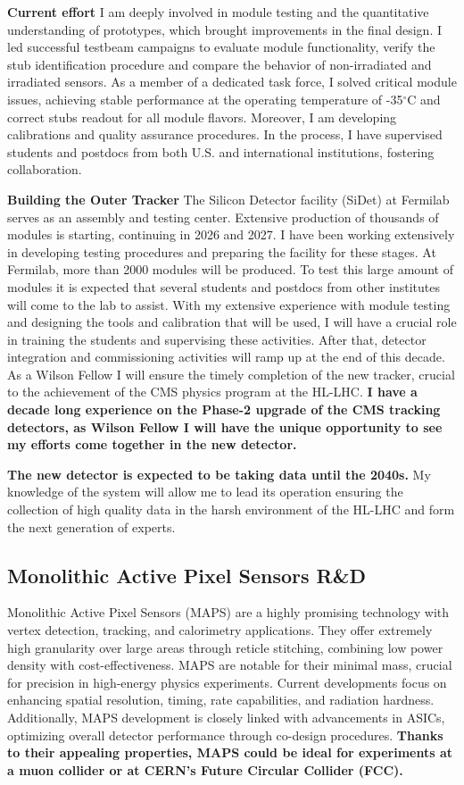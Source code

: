 {\begin{flushleft}
\textbf{Current effort}
I am deeply involved in module testing and the quantitative understanding of prototypes, which brought improvements in the final design. I led successful testbeam campaigns to evaluate module functionality, verify the stub identification procedure and compare the behavior of non-irradiated and irradiated sensors. As a member of a dedicated task force, I solved critical module issues, achieving stable performance at the operating temperature of -35$^{\circ}$C and correct stubs readout for all module flavors. Moreover, I am developing calibrations and quality assurance procedures. In the process, I have supervised students and postdocs from both U.S. and international institutions, fostering collaboration.

\textbf{Building the Outer Tracker}
The Silicon Detector facility (SiDet) at Fermilab serves as an assembly and testing center. Extensive production of thousands of modules is starting, continuing in 2026 and 2027. I have been working extensively in developing testing procedures and preparing the facility for these stages. At Fermilab, more than 2000 modules will be produced. To test this large amount of modules it is expected that several students and postdocs from other institutes will come to the lab to assist. With my extensive experience with module testing and designing the tools and calibration that will be used, I will have a crucial role in training the students and supervising these activities. 
After that, detector integration and commissioning activities will ramp up at the end of this decade. As a Wilson Fellow I will ensure the timely completion of the new tracker, crucial to the  achievement of the CMS physics program at the HL-LHC.
\textbf{I have a decade long experience on the Phase-2 upgrade of the CMS tracking detectors, as Wilson Fellow I will have the unique opportunity to see my efforts come together in the new detector.} 

{\bf The new detector is expected to be taking data until the 2040s.} My knowledge of the system will allow me to lead its operation ensuring the collection of high quality data in the harsh environment of the HL-LHC and form the next generation of experts.

\vskip 4pt 
\subsection{Monolithic Active Pixel Sensors R\&D}
Monolithic Active Pixel Sensors (MAPS) are a highly promising technology with vertex detection, tracking, and calorimetry applications. They offer extremely high granularity over large areas through reticle stitching, combining low power density with cost-effectiveness. MAPS are notable for their minimal mass, crucial for precision in high-energy physics experiments.
Current developments focus on enhancing spatial resolution, timing, rate capabilities, and radiation hardness. Additionally, MAPS development is closely linked with advancements in ASICs, optimizing overall detector performance through co-design procedures. {\bf Thanks to their appealing properties, MAPS could be ideal for experiments at a muon collider or at CERN's Future Circular Collider (FCC).}


\end{flushleft}}
